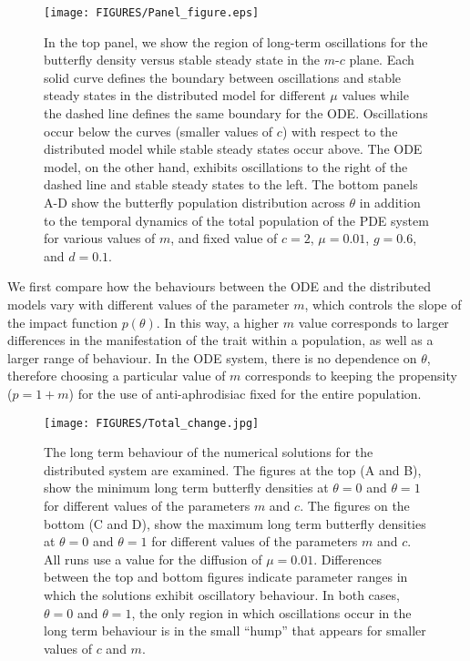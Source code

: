 \documentclass[review,authoryear]{elsarticle}
\newcommand{\origC}{{c}}
\newcommand{\origTheta}{{\theta}}
\newcommand{\origM}{m}
\begin{document}
\begin{figure}[!htp]
\begin{center}
\texttt{[image: FIGURES/Panel\_figure.eps]} 
\end{center}
\caption{In the top panel, we show the region of long-term oscillations for the butterfly density versus stable steady state in the $\origM$-$\origC$ plane. Each solid curve defines the boundary between oscillations and stable steady states in the distributed model for different $\mu$ values while the dashed line defines the same boundary for the ODE. Oscillations occur below the curves (smaller values of $c$) with respect to the distributed model while stable steady states occur above. The ODE model, on the other hand, exhibits oscillations to the right of the dashed line and stable steady states to the left.  The bottom panels A-D show the butterfly population distribution across $\theta$ in addition to the temporal dynamics of the total population of the PDE system for various values of $\origM$, and fixed value of $c=2$, $\mu=0.01$, $g=0.6$, and
$d=0.1$.}
\label{fig:m-c-behaviours}
\end{figure}

We first compare how the behaviours between the ODE and the distributed models vary with different values of the parameter $\origM$, which controls the slope of the impact function $p(\theta)$. In this way, a higher $\origM$ value corresponds to larger differences in the manifestation of the trait within a population, as well as a larger range of behaviour. In the ODE system, there is no dependence on $\theta$, therefore choosing a particular value of $\origM$ corresponds to keeping the propensity ($p=1+m$) for the use of anti-aphrodisiac fixed for the entire population. 


\begin{figure}[!htp]
\texttt{[image: FIGURES/Total\_change.jpg]} 
\caption{The long term behaviour of the numerical solutions for the distributed system are examined.
The figures at the top (A and B), show the minimum long term butterfly densities at $\origTheta=0$ and $\origTheta=1$ for different values of the parameters $\origM$ and $\origC$. The figures on the bottom (C and D), show the maximum long term butterfly densities at $\origTheta=0$ and $\origTheta=1$ for different values of the parameters $\origM$ and $\origC$.   All runs use a value for the diffusion of $\mu=0.01$. Differences between the top and bottom figures indicate parameter ranges in which the solutions exhibit oscillatory behaviour. In both cases, $\origTheta=0$ and $\origTheta=1$, the only region in which oscillations occur in the long term behaviour is in the small ``hump'' that appears for smaller values of $\origC$ and $\origM$.}
\label{fig: 10percent_change}
\end{figure}
\end{document}
